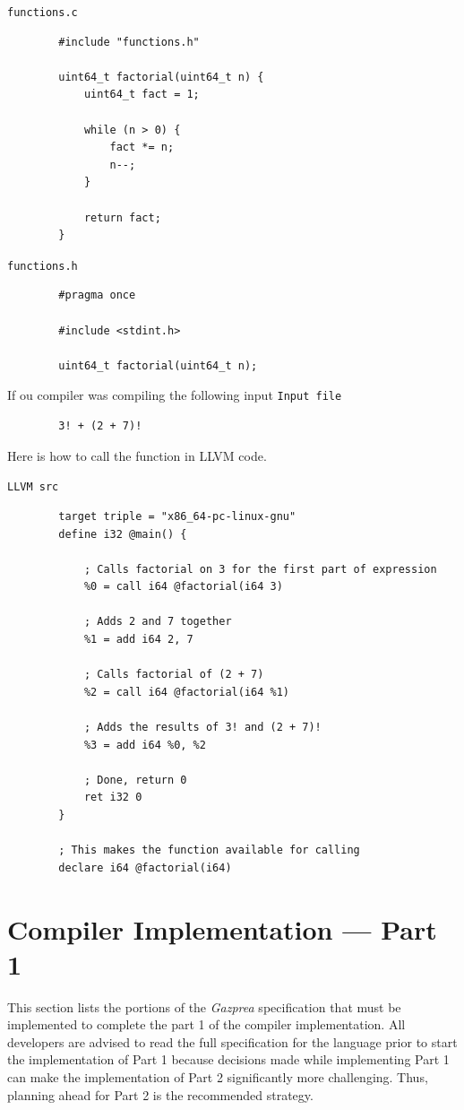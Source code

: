\documentclass{article}
\begin{document}
		\texttt{functions.c}
		\begin{lstlisting}
		#include "functions.h"

		uint64_t factorial(uint64_t n) {
		    uint64_t fact = 1;

		    while (n > 0) {
		        fact *= n;
		        n--;
		    }

		    return fact;
		}
		\end{lstlisting}

		\texttt{functions.h}
		\begin{lstlisting}
		#pragma once

		#include <stdint.h>

		uint64_t factorial(uint64_t n);
		\end{lstlisting}

		If ou compiler was compiling the following input
		\texttt{Input file}
		\begin{lstlisting}
		3! + (2 + 7)!
		\end{lstlisting}
		Here is how to call the function in LLVM code.

		\texttt{LLVM src}
		\begin{lstlisting}
		target triple = "x86_64-pc-linux-gnu"
		define i32 @main() {

		    ; Calls factorial on 3 for the first part of expression
		    %0 = call i64 @factorial(i64 3)

		    ; Adds 2 and 7 together
		    %1 = add i64 2, 7

		    ; Calls factorial of (2 + 7)
		    %2 = call i64 @factorial(i64 %1)

		    ; Adds the results of 3! and (2 + 7)!
		    %3 = add i64 %0, %2

		    ; Done, return 0
		    ret i32 0
		}

		; This makes the function available for calling
		declare i64 @factorial(i64)
		\end{lstlisting}

\section{Compiler Implementation --- Part 1}\label{sec:part1}
	This section lists the portions of the  \textit{Gazprea} specification that must be implemented to complete the part 1 of the compiler implementation.
All developers are advised to read the full
	specification for the language prior to start the implementation of Part 1 because decisions made while implementing Part 1 can make the implementation of Part 2 significantly more challenging. Thus, planning ahead for Part 2 is the recommended strategy.
\end{document}
